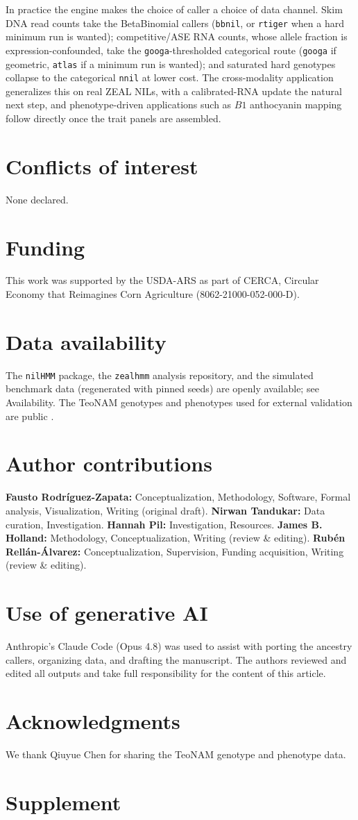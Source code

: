 \documentclass[9pt,twocolumn,twoside]{rilabRxiv}
\newcommand{\nnil}{\texttt{nnil}\xspace}
\newcommand{\bbnil}{\texttt{bbnil}\xspace}
\newcommand{\rtiger}{\texttt{rtiger}\xspace}
\newcommand{\googa}{\texttt{googa}\xspace}
\newcommand{\atlas}{\texttt{atlas}\xspace}
\newcommand{\beginsupplement}{%
        \setcounter{table}{0}
        \renewcommand{\thetable}{S\arabic{table}}%
        \setcounter{figure}{0}
        \renewcommand{\thefigure}{S\arabic{figure}}%
     }
\begin{document}
In practice the engine makes the choice of caller a choice of data channel. Skim DNA
read counts take the BetaBinomial callers (\bbnil, or \rtiger when a hard minimum run is
wanted); competitive/ASE RNA counts, whose allele fraction is expression-confounded,
take the \googa-thresholded categorical route (\googa if geometric, \atlas if a minimum
run is wanted); and saturated hard genotypes
collapse to the categorical \nnil at lower cost. The cross-modality application
generalizes this on real ZEAL NILs, with a calibrated-RNA update the natural next step,
and phenotype-driven applications such as $B1$ anthocyanin mapping follow directly once
the trait panels are assembled.

\section*{Conflicts of interest}
None declared.

\section*{Funding}
This work was supported by the USDA-ARS as part of CERCA, Circular Economy that
Reimagines Corn Agriculture (8062-21000-052-000-D).

\section*{Data availability}
The \texttt{nilHMM} package, the \texttt{zealhmm} analysis repository, and the
simulated benchmark data (regenerated with pinned seeds) are openly available;
see Availability. The TeoNAM genotypes and phenotypes used for external validation
are public \citep{chen2019teonam,tomura2025ensemble}.

\section*{Author contributions}
\textbf{Fausto Rodr\'iguez-Zapata:} Conceptualization, Methodology, Software, Formal
analysis, Visualization, Writing (original draft).
\textbf{Nirwan Tandukar:} Data curation, Investigation.
\textbf{Hannah Pil:} Investigation, Resources.
\textbf{James B. Holland:} Methodology, Conceptualization, Writing (review \&
editing).
\textbf{Rub\'en Rell\'an-\'Alvarez:} Conceptualization, Supervision, Funding
acquisition, Writing (review \& editing).

\section*{Use of generative AI}
Anthropic's Claude Code (Opus 4.8) was used to assist with porting the ancestry
callers, organizing data, and drafting the manuscript. The authors reviewed and edited
all outputs and take full responsibility for the content of this article.

\section{Acknowledgments}
We thank Qiuyue Chen for sharing the TeoNAM genotype and phenotype data.



\onecolumn
\section*{Supplement}
\beginsupplement
\end{document}
